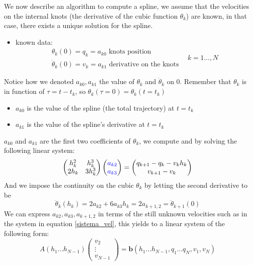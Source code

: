 \documentclass[10pt, letterpaper]{report}
\begin{document}
We now describe an algorithm to compute a spline, we assume that the velocities on the internal knots (the derivative of the cubic function $\theta_k$) are known, in that case, there exists a unique solution for the spline.\begin{itemize}
    \item known data:$$\begin{matrix}
        \theta_k(0)=q_k=a_{k0} \text{ knots position }\\
        \dot\theta_k(0)=v_k=a_{k1}\text{ derivative on the knots} 
    \end{matrix} \ \ \ \ k=1\dots,N$$
\end{itemize}
Notice how we denoted $a_{k0},a_{k1}$ the value of $\theta_k$ and $\dot \theta_k$ on $0$. Remember that $\theta_k$ is in function of $\tau = t-t_k$, so $\theta_k(\tau=0)=\theta_k(t=t_k)$\begin{itemize}
    \item $a_{k0}$ is the value of the spline (the total trajectory) at $t=t_k$
    \item $a_{k1}$ is the value of the spline's derivative at $t=t_k$
\end{itemize}
$a_{k0}$ and $a_{k1}$ are the first two coefficients of $\theta_k$, we compute  and  by solving the following linear system:\begin{equation}\label{sistema_vel}
    \begin{pmatrix}
        h_k^2&h_k^3\\ 
        2h_k&3h_k^3 
    \end{pmatrix}
    \begin{pmatrix}
        \color{blue}a_{k2}\color{black}\\\color{blue}a_{k3}\color{black}
    \end{pmatrix}=\begin{pmatrix}
        q_{k+1}-q_k-v_kh_k\\ 
        v_{k+1}-v_k
    \end{pmatrix}
\end{equation}
And we impose the continuity on the cubic $\theta_k$ by letting the second derivative to be\begin{equation}
    \ddot{\theta}_k(h_k)=2a_{k2}+6a_{k3}h_k=2a_{k+1,2}=\ddot\theta_{k+1}(0)
\end{equation}
We can express $a_{k2},a_{k3},a_{k+1,2}$ in terms of the still unknown velocities such as in the system in equation \eqref{sistema_vel}, this yields to a linear system of the following form:\begin{equation}\label{sistema_vel2}
    A(h_1\dots h_{N-1})\begin{pmatrix}
        v_2\\ \vdots\\  v_{N-1}
    \end{pmatrix}=\mathbf b(h_1\dots h_{N-1},q_1\dots q_N,v_1,v_N)
\end{equation}
\end{document}
